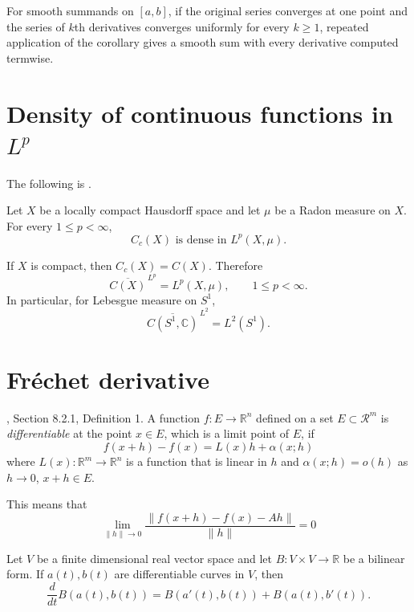 \begin{remark}
\label{remark-smooth-series}
For smooth summands on $[a,b]$, if the
original series converges at one point and
the series of $k$th derivatives converges
uniformly for every $k\geq1$, repeated
application of the corollary gives a smooth
sum with every derivative computed termwise.
\end{remark}

\section{Density of continuous functions in $L^p$}
\label{section-density-continuous-lp}

The following is \cite[Proposition~7.9]{folland-real-analysis}.

\begin{proposition}
\label{proposition-cc-dense-lp}
Let $X$ be a locally compact Hausdorff space and let $\mu$ be a
Radon measure on $X$. For every $1\leq p<\infty$,
\[
C_c(X)\text{ is dense in }L^p(X,\mu).
\]
\end{proposition}

\begin{remark}
\label{remark-continuous-dense-lp-compact}
If $X$ is compact, then $C_c(X)=C(X)$. Therefore
\[
\overline{C(X)}^{\,L^p}=L^p(X,\mu),
\qquad 1\leq p<\infty.
\]
In particular, for Lebesgue measure on $S^1$,
\[
\overline{C(S^1,\mathbb C)}^{\,L^2}=L^2(S^1).
\]
\end{remark}

\section{Fréchet derivative}
\label{section-Fréchet-derivative}

\begin{definition}
\label{definition-Frechet-derivative}
\cite{zo1}, Section 8.2.1, Definition 1. A
function $f:E \to \mathbb{R}^n$
defined on a set $E \subset \mathcal{R}^m$ is
{\it differentiable} at the point
$x \in E$, which is a limit point of $E$, if
$$
f(x+h)-f(x)=L(x)h+\alpha(x;h)
$$
where $L(x):\mathbb{R}^m\to \mathbb{R}^n$ is
a function that is linear in $h$
and $\alpha(x;h)=o(h)$ as $h\to 0$, $x+h\in
E$.
\end{definition}

This means that
$$
\lim_{\|h\|\to 0}
\frac{\|f(x+h)-f(x)-Ah\|}{\|h\|}=0
$$
\begin{lemma}
\label{lemma-differentiating-bilinear-form}
Let $V$ be a finite dimensional real vector
space and let $B:V\times V\to \mathbb{R}$ be
a bilinear form. If $a(t),b(t)$ are
differentiable
curves in $V$, then
$$
\frac{d}{dt}B(a(t),b(t))
=
B(a'(t),b(t))+B(a(t),b'(t)).
$$
\end{lemma}

